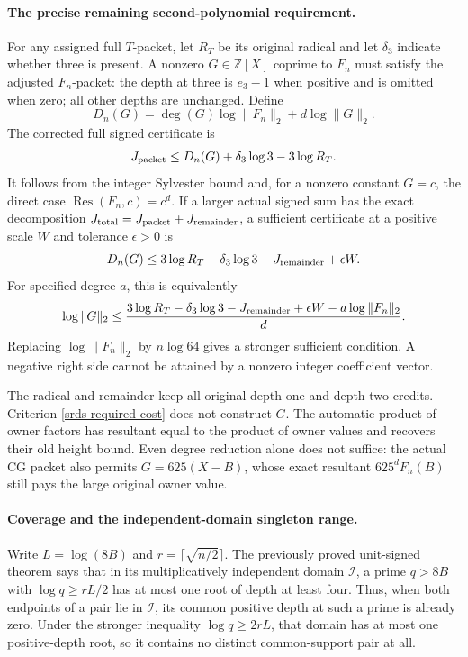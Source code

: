 \paragraph{The precise remaining second-polynomial requirement.}
For any assigned full \(T\)-packet, let \(R_T\) be its original
radical and let \(\delta_3\) indicate whether three is present.
A nonzero \(G\in\mathbb Z[X]\) coprime to \(F_n\) must satisfy
the adjusted \(F_n\)-packet: the depth at three is \(e_3-1\)
when positive and is omitted when zero; all other depths are
unchanged. Define
\[
 D_n(G)=\deg(G)\log\|F_n\|_2+d\log\|G\|_2.
\]
The corrected full signed certificate is
\begin{equation}
 J_{\rm packet}\le D_n(G)+\delta_3\log3-3\log R_T.
 \label{srds-second-certificate}
\end{equation}
It follows from the integer Sylvester bound and, for a nonzero
constant \(G=c\), the direct case
\(\operatorname{Res}(F_n,c)=c^d\).
If a larger actual signed sum has the exact decomposition
\(J_{\rm total}=J_{\rm packet}+J_{\rm remainder}\), a sufficient
certificate at a positive scale \(W\) and tolerance \(\epsilon>0\)
is
\begin{equation}
 D_n(G)\le3\log R_T-\delta_3\log3
                   -J_{\rm remainder}+\epsilon W.
 \label{srds-required-cost}
\end{equation}
For specified degree \(a\), this is equivalently
\[
 \log\|G\|_2\le
 \frac{3\log R_T-\delta_3\log3-J_{\rm remainder}
             +\epsilon W-a\log\|F_n\|_2}{d}.
\]
Replacing \(\log\|F_n\|_2\) by \(n\log64\) gives a stronger
sufficient condition. A negative right side cannot be attained
by a nonzero integer coefficient vector.

The radical and remainder keep all original depth-one and
depth-two credits. Criterion \eqref{srds-required-cost} does
not construct \(G\). The automatic product of owner factors has
resultant equal to the product of owner values and recovers their
old height bound. Even degree reduction alone does not suffice:
the actual CG packet also permits \(G=625(X-B)\), whose exact
resultant \(625^dF_n(B)\) still pays the large original owner value.

\paragraph{Coverage and the independent-domain singleton range.}
Write \(L=\log(8B)\) and \(r=\lceil\sqrt{n/2}\rceil\).
The previously proved unit-signed theorem says that in its
multiplicatively independent domain \(\mathcal I\), a prime
\(q>8B\) with \(\log q\ge rL/2\) has at most one root of
depth at least four. Thus, when both endpoints of a pair lie
in \(\mathcal I\), its common positive depth at such a prime
is already zero. Under the stronger inequality
\(\log q\ge2rL\), that domain has at most one positive-depth
root, so it contains no distinct common-support pair at all.

